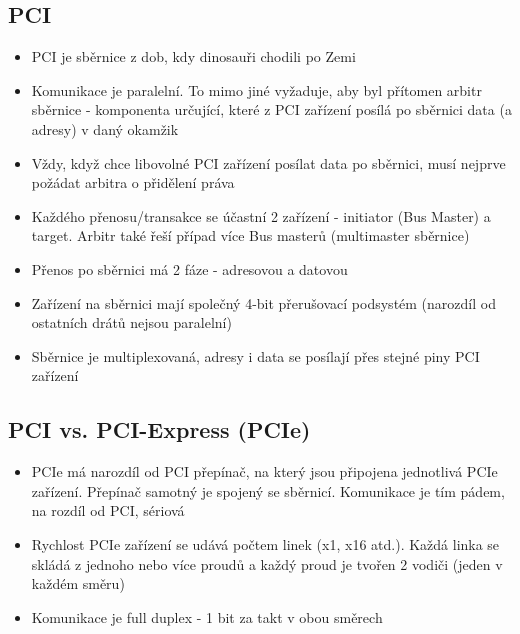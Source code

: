 \documentclass[10pt,a4paper,openright]{article}
\begin{document}
\subsection{PCI}
\begin{itemize}
\item PCI je sběrnice z dob, kdy dinosauři chodili po Zemi
\item Komunikace je paralelní. To mimo jiné vyžaduje, aby byl přítomen arbitr sběrnice - komponenta určující, které z PCI zařízení posílá po sběrnici data (a adresy) v daný okamžik
\item Vždy, když chce libovolné PCI zařízení posílat data po sběrnici, musí nejprve požádat arbitra o přidělení práva
\item Každého přenosu/transakce se účastní 2 zařízení - initiator (Bus Master) a target. Arbitr také řeší případ více Bus masterů (multimaster sběrnice)
\item Přenos po sběrnici má 2 fáze - adresovou a datovou
\item Zařízení na sběrnici mají společný 4-bit přerušovací podsystém (narozdíl od ostatních drátů nejsou paralelní)
\item Sběrnice je multiplexovaná, adresy i data se posílají přes stejné piny PCI zařízení
\end{itemize}

\subsection{PCI vs. PCI-Express (PCIe)}
\begin{itemize}
\item PCIe má narozdíl od PCI přepínač, na který jsou připojena jednotlivá PCIe zařízení. Přepínač samotný je spojený se sběrnicí. Komunikace je tím pádem, na rozdíl od PCI, sériová
\item Rychlost PCIe zařízení se udává počtem linek (x1, x16 atd.). Každá linka se skládá z jednoho nebo více proudů a každý proud je tvořen 2 vodiči (jeden v každém směru)
\item Komunikace je full duplex - 1 bit za takt v obou směrech
\end{itemize}
\end{document}
